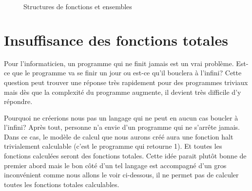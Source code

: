 \begin{figure}[h]
  \centering
  \caption{Structures de fonctions et ensembles}
  \label{rb}
\end{figure}



\section{Insuffisance des fonctions totales}
\label{sec:insuffisance_des_fonctions_totales}
Pour l'informaticien, un programme qui ne finit jamais est un vrai problème. Est-ce que le programme va se finir un jour ou est-ce qu'il bouclera à l'infini? Cette question peut trouver une réponse très rapidement pour des programmes triviaux mais dès que la complexité du programme augmente, il devient très difficile d'y répondre.

Pourquoi ne créerions nous pas un langage qui ne peut en aucun cas boucler à l'infini? Après tout, personne n'a envie d'un programme qui ne s'arrête jamais. Dans ce cas, le modèle de calcul que nous aurons créé aura une fonction halt trivialement calculable (c'est le programme qui retourne 1). Et toutes les fonctions calculées seront des fonctions totales. Cette idée parait plutôt bonne de premier abord mais le bon côté d'un tel langage est accompagné d'un gros inconvénient comme nous allons le voir ci-dessous, il ne permet pas de calculer toutes les fonctions totales calculables.

